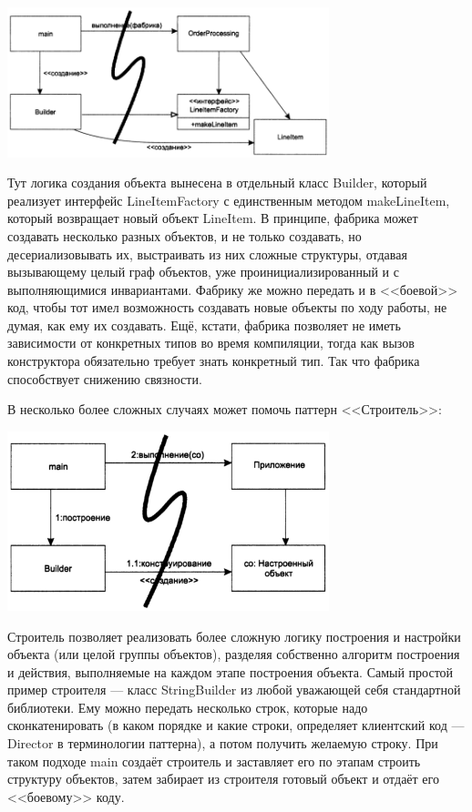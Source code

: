 \documentclass{../../text-style}
\begin{document}
\begin{center}
    \includegraphics[width=0.7\textwidth]{factory.png}
\end{center}

Тут логика создания объекта вынесена в отдельный класс Builder, который реализует интерфейс LineItemFactory с единственным методом makeLineItem, который возвращает новый объект LineItem. В принципе, фабрика может создавать несколько разных объектов, и не только создавать, но десериализовывать их, выстраивать из них сложные структуры, отдавая вызывающему целый граф объектов, уже проинициализированный и с выполняющимися инвариантами. Фабрику же можно передать и в <<боевой>> код, чтобы тот имел возможность создавать новые объекты по ходу работы, не думая, как ему их создавать. Ещё, кстати, фабрика позволяет не иметь зависимости от конкретных типов во время компиляции, тогда как вызов конструктора обязательно требует знать конкретный тип. Так что фабрика способствует снижению связности.

В несколько более сложных случаях может помочь паттерн <<Строитель>>:

\begin{center}
    \includegraphics[width=0.7\textwidth]{builder.png}
\end{center}

Строитель позволяет реализовать более сложную логику построения и настройки объекта (или целой группы объектов), разделяя собственно алгоритм построения и действия, выполняемые на каждом этапе построения объекта. Самый простой пример строителя --- класс StringBuilder из любой уважающей себя стандартной библиотеки. Ему можно передать несколько строк, которые надо сконкатенировать (в каком порядке и какие строки, определяет клиентский код --- Director в терминологии паттерна), а потом получить желаемую строку. При таком подходе main создаёт строитель и заставляет его по этапам строить структуру объектов, затем забирает из строителя готовый объект и отдаёт его <<боевому>> коду.
\end{document}
